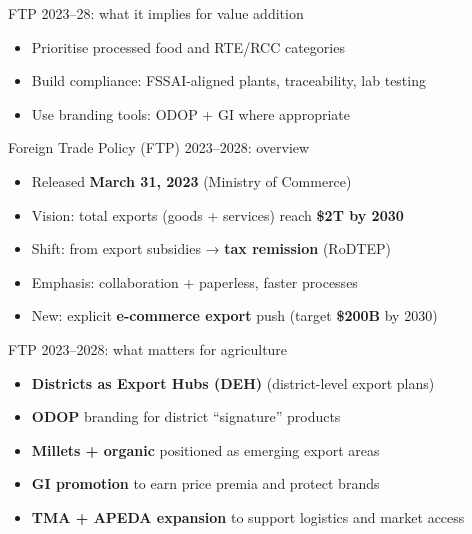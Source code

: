 \documentclass[
  ignorenonframetext,
  aspectratio=169,
]{beamer}
\makeatletter
\providecommand{\tightlist}{%
  \setlength{\itemsep}{0pt}\setlength{\parskip}{0pt}}
\let\quarto@originallabel\label
\DeclareRobustCommand*{\label}[1]{\quarto@originallabel{#1}}
\makeatother
\begin{document}
\begin{frame}
\begin{block}{FTP 2023--28: what it implies for value addition}
\label{ftp-202328-what-it-implies-for-value-addition}
\begin{itemize}
\tightlist
\item
  Prioritise processed food and RTE/RCC categories
\item
  Build compliance: FSSAI-aligned plants, traceability, lab testing
\item
  Use branding tools: ODOP + GI where appropriate
\end{itemize}

\end{block}
\end{frame}

\begin{frame}
\begin{block}{Foreign Trade Policy (FTP) 2023--2028: overview}
\label{foreign-trade-policy-ftp-20232028-overview}
\begin{itemize}
\tightlist
\item
  Released \textbf{March 31, 2023} (Ministry of Commerce)
\item
  Vision: total exports (goods + services) reach \textbf{\$2T by 2030}
\item
  Shift: from export subsidies → \textbf{tax remission} (RoDTEP)
\item
  Emphasis: collaboration + paperless, faster processes
\item
  New: explicit \textbf{e-commerce export} push (target \textbf{\$200B}
  by 2030)
\end{itemize}
\end{block}
\end{frame}

\begin{frame}
\begin{block}{FTP 2023--2028: what matters for agriculture}
\label{ftp-20232028-what-matters-for-agriculture}
\begin{itemize}
\tightlist
\item
  \textbf{Districts as Export Hubs (DEH)} (district-level export plans)
\item
  \textbf{ODOP} branding for district ``signature'' products
\item
  \textbf{Millets + organic} positioned as emerging export areas
\item
  \textbf{GI promotion} to earn price premia and protect brands
\item
  \textbf{TMA + APEDA expansion} to support logistics and market access
\end{itemize}

\end{block}
\end{frame}
\end{document}
